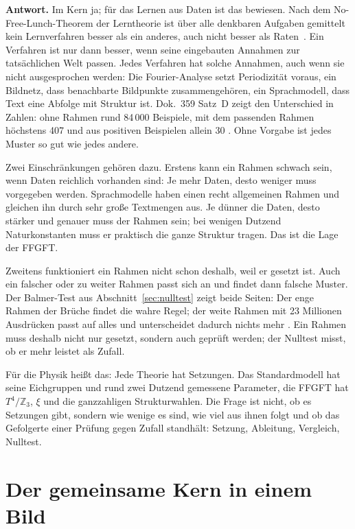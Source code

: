 \textbf{Antwort.} Im Kern ja; für das Lernen aus Daten ist das bewiesen. Nach dem No-Free-Lunch-Theorem
der Lerntheorie ist über alle denkbaren Aufgaben gemittelt kein Lernverfahren besser als ein anderes,
auch nicht besser als Raten \QM\,\cite{Wolpert1996}. Ein Verfahren ist nur dann besser, wenn seine
eingebauten Annahmen zur tatsächlichen Welt passen. Jedes Verfahren hat solche Annahmen, auch wenn sie
nicht ausgesprochen werden: Die Fourier-Analyse setzt Periodizität voraus, ein Bildnetz, dass
benachbarte Bildpunkte zusammengehören, ein Sprachmodell, dass Text eine Abfolge mit Struktur ist.
Dok.~359 Satz~D zeigt den Unterschied in Zahlen: ohne Rahmen rund 84\,000 Beispiele, mit dem
passenden Rahmen höchstens 407 und aus positiven Beispielen allein 30 \KM. Ohne Vorgabe ist jedes
Muster so gut wie jedes andere.

Zwei Einschränkungen gehören dazu. Erstens kann ein Rahmen schwach sein, wenn Daten reichlich
vorhanden sind: Je mehr Daten, desto weniger muss vorgegeben werden. Sprachmodelle haben einen recht
allgemeinen Rahmen und gleichen ihn durch sehr große Textmengen aus. Je dünner die Daten, desto stärker
und genauer muss der Rahmen sein; bei wenigen Dutzend Naturkonstanten muss er praktisch die ganze
Struktur tragen. Das ist die Lage der FFGFT.

Zweitens funktioniert ein Rahmen nicht schon deshalb, weil er gesetzt ist. Auch ein falscher oder zu
weiter Rahmen passt sich an und findet dann falsche Muster. Der Balmer-Test aus
Abschnitt~\ref{sec:nulltest} zeigt beide Seiten: Der enge Rahmen der Brüche findet die wahre Regel;
der weite Rahmen mit 23 Millionen Ausdrücken passt auf alles und unterscheidet dadurch nichts mehr
\KM. Ein Rahmen muss deshalb nicht nur gesetzt, sondern auch geprüft werden; der Nulltest misst, ob
er mehr leistet als Zufall.

Für die Physik heißt das: Jede Theorie hat Setzungen. Das Standardmodell hat seine Eichgruppen und
rund zwei Dutzend gemessene Parameter, die FFGFT hat $T^4/\mathbb Z_3$, $\xi$ und die ganzzahligen
Strukturwahlen. Die Frage ist nicht, ob es Setzungen gibt, sondern wie wenige es sind, wie viel aus
ihnen folgt und ob das Gefolgerte einer Prüfung gegen Zufall standhält: Setzung, Ableitung,
Vergleich, Nulltest.

\section{Der gemeinsame Kern in einem Bild}


